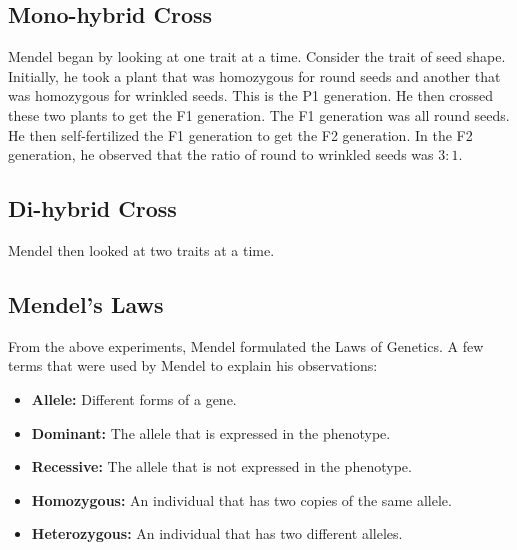 \documentclass[12pt, oneside]{book}
\begin{document}
\subsection{Mono-hybrid Cross}
Mendel began by looking at one trait at a time.
Consider the trait of seed shape.
Initially, he took a plant that was homozygous for round seeds and another that was homozygous for wrinkled seeds.
This is the P1 generation.
He then crossed these two plants to get the F1 generation.
The F1 generation was all round seeds.
He then self-fertilized the F1 generation to get the F2 generation.
In the F2 generation, he observed that the ratio of round to wrinkled seeds was \(3 : 1\).

\subsection{Di-hybrid Cross}
Mendel then looked at two traits at a time.

\subsection{Mendel's Laws}
From the above experiments, Mendel formulated the Laws of Genetics.
A few terms that were used by Mendel to explain his observations:
\begin{itemize}
    \item \textbf{Allele:} Different forms of a gene.
    \item \textbf{Dominant:} The allele that is expressed in the phenotype.
    \item \textbf{Recessive:} The allele that is not expressed in the phenotype.
    \item \textbf{Homozygous:} An individual that has two copies of the same allele.
    \item \textbf{Heterozygous:} An individual that has two different alleles.
\end{itemize}
\end{document}
